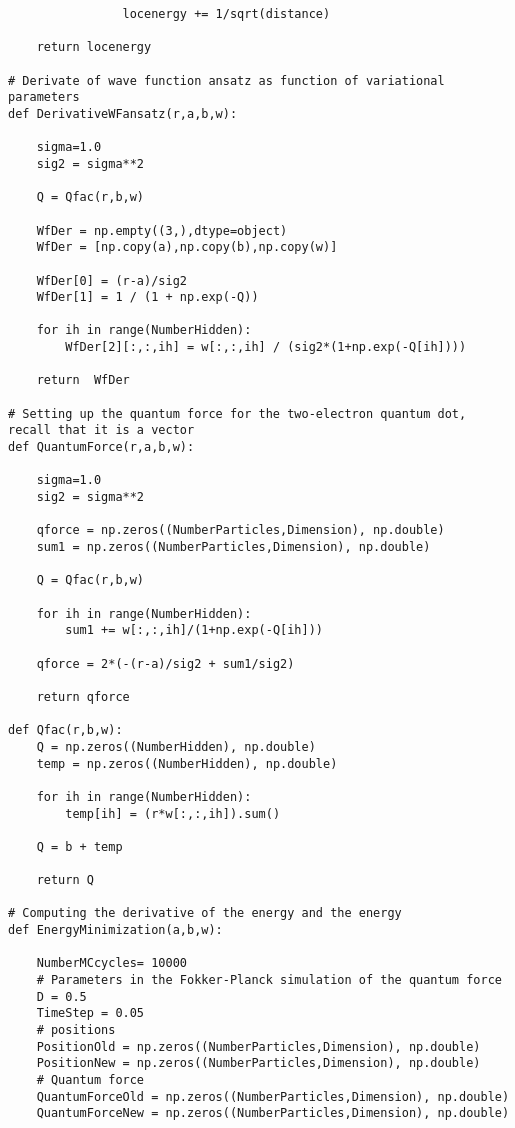 \documentclass[%
oneside,                 %
final,                   %
10pt]{article}
\begin{document}
\begin{verbatim}
                locenergy += 1/sqrt(distance)
                
    return locenergy

# Derivate of wave function ansatz as function of variational parameters
def DerivativeWFansatz(r,a,b,w):
    
    sigma=1.0
    sig2 = sigma**2
    
    Q = Qfac(r,b,w)
    
    WfDer = np.empty((3,),dtype=object)
    WfDer = [np.copy(a),np.copy(b),np.copy(w)]
    
    WfDer[0] = (r-a)/sig2
    WfDer[1] = 1 / (1 + np.exp(-Q))
    
    for ih in range(NumberHidden):
        WfDer[2][:,:,ih] = w[:,:,ih] / (sig2*(1+np.exp(-Q[ih])))
            
    return  WfDer

# Setting up the quantum force for the two-electron quantum dot, recall that it is a vector
def QuantumForce(r,a,b,w):

    sigma=1.0
    sig2 = sigma**2
    
    qforce = np.zeros((NumberParticles,Dimension), np.double)
    sum1 = np.zeros((NumberParticles,Dimension), np.double)
    
    Q = Qfac(r,b,w)
    
    for ih in range(NumberHidden):
        sum1 += w[:,:,ih]/(1+np.exp(-Q[ih]))
    
    qforce = 2*(-(r-a)/sig2 + sum1/sig2)
    
    return qforce
    
def Qfac(r,b,w):
    Q = np.zeros((NumberHidden), np.double)
    temp = np.zeros((NumberHidden), np.double)
    
    for ih in range(NumberHidden):
        temp[ih] = (r*w[:,:,ih]).sum()
        
    Q = b + temp
    
    return Q
    
# Computing the derivative of the energy and the energy 
def EnergyMinimization(a,b,w):

    NumberMCcycles= 10000
    # Parameters in the Fokker-Planck simulation of the quantum force
    D = 0.5
    TimeStep = 0.05
    # positions
    PositionOld = np.zeros((NumberParticles,Dimension), np.double)
    PositionNew = np.zeros((NumberParticles,Dimension), np.double)
    # Quantum force
    QuantumForceOld = np.zeros((NumberParticles,Dimension), np.double)
    QuantumForceNew = np.zeros((NumberParticles,Dimension), np.double)


\end{verbatim}
\end{document}
